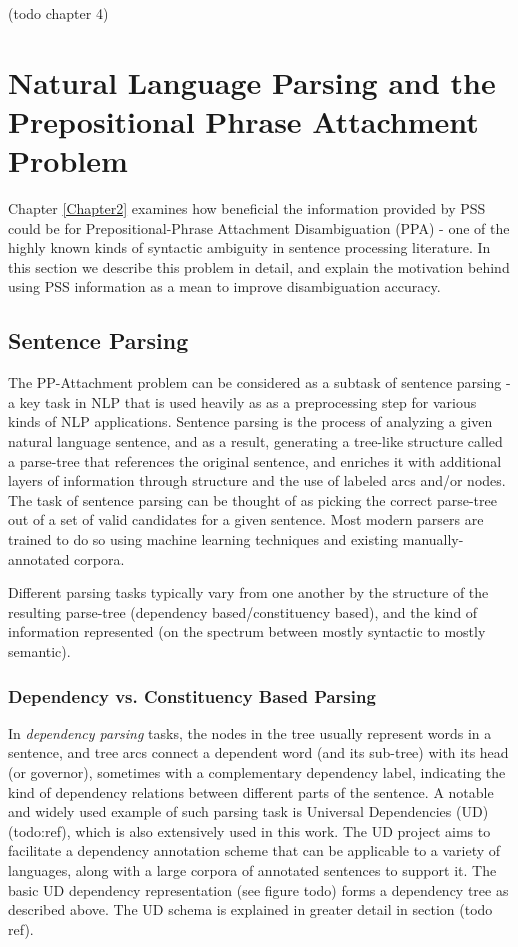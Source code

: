 (todo chapter 4)

\pagebreak

\section{Natural Language Parsing and the Prepositional Phrase Attachment Problem} \label{sec:ppatt}

Chapter \ref{Chapter2} examines how beneficial the information provided by PSS could be for Prepositional-Phrase Attachment Disambiguation (PPA)  - one of the highly known kinds of syntactic ambiguity in sentence processing literature. In this section we describe this problem in detail, and explain the motivation behind using PSS information as a mean to improve disambiguation accuracy. 

\subsection{Sentence Parsing}

The PP-Attachment problem can be considered as a subtask of sentence parsing - a key task in NLP that is used heavily as as a preprocessing step for various kinds of NLP applications.  Sentence parsing is the process of analyzing a given natural language sentence, and as a result, generating a tree-like structure called a parse-tree that references the original sentence, and enriches it with additional layers of information through structure and the use of labeled arcs and/or nodes. The task of sentence parsing can be thought of as picking the correct parse-tree out of a set of valid candidates for a given sentence. Most modern parsers are trained to do so using machine learning techniques and existing manually-annotated corpora.

 Different parsing tasks typically vary from one another by the structure of the resulting parse-tree (dependency based/constituency based), and the kind of information represented (on the spectrum between mostly syntactic to mostly semantic).

\subsubsection{Dependency vs. Constituency Based Parsing}

In \emph{dependency parsing} tasks, the nodes in the tree usually represent words in a sentence, and tree arcs connect a dependent word (and its sub-tree) with its head (or governor), sometimes with a complementary dependency label, indicating the kind of dependency relations between different parts of the sentence. A notable and widely used example of such parsing task is Universal Dependencies (UD) (todo:ref), which is also extensively used in this work. The UD project aims to facilitate a dependency annotation scheme that can be applicable to a variety of languages, along with a large corpora of annotated sentences to support it. The basic UD dependency representation (see figure todo) forms a dependency tree as described above. The UD schema is explained in greater detail in section (todo ref).

